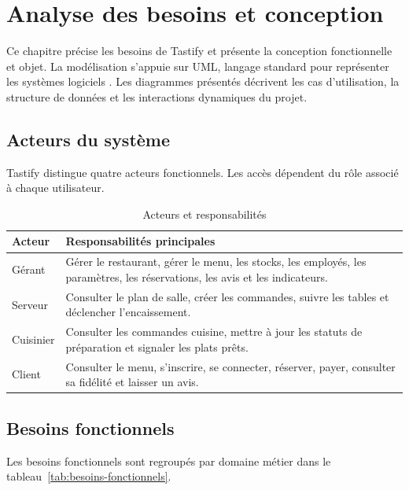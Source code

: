\chapter{Analyse des besoins et conception}
\label{chap:conception}

Ce chapitre précise les besoins de Tastify et présente la conception fonctionnelle et objet. La modélisation s'appuie sur UML, langage standard pour représenter les systèmes logiciels \cite{uml}. Les diagrammes présentés décrivent les cas d'utilisation, la structure de données et les interactions dynamiques du projet.

\section{Acteurs du système}
Tastify distingue quatre acteurs fonctionnels. Les accès dépendent du rôle associé à chaque utilisateur.

\begin{table}[H]
\centering
\caption{Acteurs et responsabilités}
\label{tab:acteurs}
\begin{tabularx}{\textwidth}{p{3cm}Y}
\toprule
\textbf{Acteur} & \textbf{Responsabilités principales} \\
\midrule
Gérant & Gérer le restaurant, gérer le menu, les stocks, les employés, les paramètres, les réservations, les avis et les indicateurs. \\
Serveur & Consulter le plan de salle, créer les commandes, suivre les tables et déclencher l'encaissement. \\
Cuisinier & Consulter les commandes cuisine, mettre à jour les statuts de préparation et signaler les plats prêts. \\
Client & Consulter le menu, s'inscrire, se connecter, réserver, payer, consulter sa fidélité et laisser un avis. \\
\bottomrule
\end{tabularx}
\end{table}

\section{Besoins fonctionnels}
Les besoins fonctionnels sont regroupés par domaine métier dans le tableau~\ref{tab:besoins-fonctionnels}.

